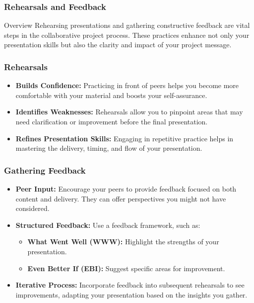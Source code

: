 \documentclass[aspectratio=169]{beamer}
\begin{document}
\begin{frame}[fragile]
    \frametitle{Rehearsals and Feedback}
    \begin{block}{Overview}
        Rehearsing presentations and gathering constructive feedback are vital steps in the collaborative project process. These practices enhance not only your presentation skills but also the clarity and impact of your project message.
    \end{block}
\end{frame}

\begin{frame}[fragile]
    \frametitle{Rehearsals}
    \begin{itemize}
        \item \textbf{Builds Confidence:} Practicing in front of peers helps you become more comfortable with your material and boosts your self-assurance.
        
        \item \textbf{Identifies Weaknesses:} Rehearsals allow you to pinpoint areas that may need clarification or improvement before the final presentation.
        
        \item \textbf{Refines Presentation Skills:} Engaging in repetitive practice helps in mastering the delivery, timing, and flow of your presentation.
    \end{itemize}
\end{frame}

\begin{frame}[fragile]
    \frametitle{Gathering Feedback}
    \begin{itemize}
        \item \textbf{Peer Input:} Encourage your peers to provide feedback focused on both content and delivery. They can offer perspectives you might not have considered.
        
        \item \textbf{Structured Feedback:} Use a feedback framework, such as:
            \begin{itemize}
                \item \textbf{What Went Well (WWW):} Highlight the strengths of your presentation.
                \item \textbf{Even Better If (EBI):} Suggest specific areas for improvement.
            \end{itemize}
        
        \item \textbf{Iterative Process:} Incorporate feedback into subsequent rehearsals to see improvements, adapting your presentation based on the insights you gather.
    \end{itemize}
\end{frame}
\end{document}
